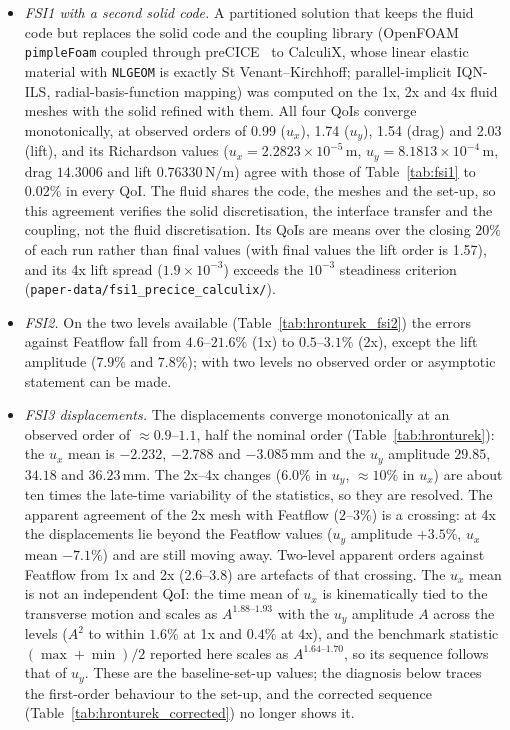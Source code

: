 \begin{itemize}
	\item \emph{FSI1 with a second solid code.} A partitioned solution that keeps the fluid code but replaces the solid code and the coupling library (OpenFOAM \texttt{pimpleFoam} coupled through preCICE~\citep{Chourdakis2022} to CalculiX, whose linear elastic material with \texttt{NLGEOM} is exactly St Venant--Kirchhoff; parallel-implicit IQN-ILS, radial-basis-function mapping) was computed on the 1x, 2x and 4x fluid meshes with the solid refined with them. All four QoIs converge monotonically, at observed orders of 0.99 ($u_x$), 1.74 ($u_y$), 1.54 (drag) and 2.03 (lift), and its Richardson values ($u_x = 2.2823\times10^{-5}\,\mathrm{m}$, $u_y = 8.1813\times10^{-4}\,\mathrm{m}$, drag $14.3006$ and lift $0.76330\,\mathrm{N/m}$) agree with those of Table~\ref{tab:fsi1} to $0.02\%$ in every QoI. The fluid shares the code, the meshes and the set-up, so this agreement verifies the solid discretisation, the interface transfer and the coupling, not the fluid discretisation. Its QoIs are means over the closing $20\%$ of each run rather than final values (with final values the lift order is 1.57), and its 4x lift spread ($1.9\times10^{-3}$) exceeds the $10^{-3}$ steadiness criterion (\texttt{paper-data/fsi1\_precice\_calculix/}).
	\item \emph{FSI2.} On the two levels available (Table~\ref{tab:hronturek_fsi2}) the errors against Featflow fall from $4.6$--$21.6\%$ (1x) to $0.5$--$3.1\%$ (2x), except the lift amplitude ($7.9\%$ and $7.8\%$); with two levels no observed order or asymptotic statement can be made.
	\item \emph{FSI3 displacements.} The displacements converge monotonically at an observed order of $\approx0.9$--$1.1$, half the nominal order (Table~\ref{tab:hronturek}): the $u_x$ mean is $-2.232$, $-2.788$ and $-3.085\,\mathrm{mm}$ and the $u_y$ amplitude $29.85$, $34.18$ and $36.23\,\mathrm{mm}$. The 2x--4x changes ($6.0\%$ in $u_y$, $\approx10\%$ in $u_x$) are about ten times the late-time variability of the statistics, so they are resolved. The apparent agreement of the 2x mesh with Featflow ($2$--$3\%$) is a crossing: at 4x the displacements lie beyond the Featflow values ($u_y$ amplitude $+3.5\%$, $u_x$ mean $-7.1\%$) and are still moving away. Two-level apparent orders against Featflow from 1x and 2x (2.6--3.8) are artefacts of that crossing. The $u_x$ mean is not an independent QoI: the time mean of $u_x$ is kinematically tied to the transverse motion and scales as $A^{1.88\text{--}1.93}$ with the $u_y$ amplitude $A$ across the levels ($A^2$ to within $1.6\%$ at 1x and $0.4\%$ at 4x), and the benchmark statistic $(\max+\min)/2$ reported here scales as $A^{1.64\text{--}1.70}$, so its sequence follows that of $u_y$. These are the baseline-set-up values; the diagnosis below traces the first-order behaviour to the set-up, and the corrected sequence (Table~\ref{tab:hronturek_corrected}) no longer shows it.

\end{itemize}
